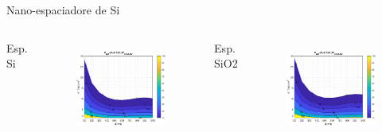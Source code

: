 \documentclass[spanish,a4paper]{beamer}%
\begin{document}
\begin{frame}{Nano-espaciadore de Si}
{			\begin{columns}
						\begin{block}{\centering Esp. Si }
						\end{block}
					\vspace{15pt}
						\begin{figure}[h]%
								\centering
										\includegraphics[width=\columnwidth]{rel_SiC}
								\label{fig:rel_SiC}%
						\end{figure}
						\vfill
					\vspace{-15pt}
						\begin{block}{\centering Esp. SiO2}
							\end{block}
					\vspace{10pt}
						\begin{figure}[h]%
								\centering
										\includegraphics[width=\columnwidth]{SiC_Rc}%
								\label{fig:SiC_Rc}%
						\end{figure}
						\vfill
				\end{columns}							
		}
	\end{frame}
\end{document}
